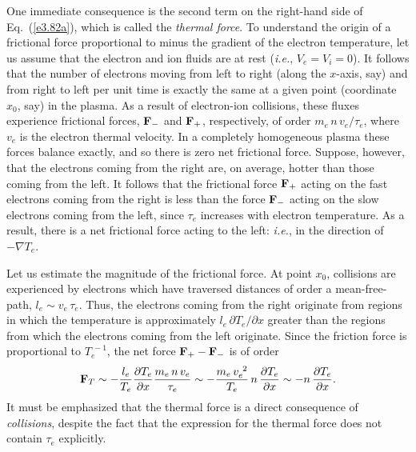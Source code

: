 One immediate consequence is the second term on the right-hand side of Eq.~(\ref{e3.82a}),
which is called the {\em thermal force}. To understand the origin of
a frictional force proportional to minus the gradient of the electron temperature,
let us assume that the electron and ion fluids are at rest ({\em i.e.}, 
$V_e=V_i =0$). It follows that the number of electrons moving from left to right
(along the $x$-axis, say) and from right to left per unit time is exactly the
same at a given point (coordinate $x_0$, say) in the plasma. As a result
of electron-ion collisions, these fluxes experience frictional forces,
${\bf F}_-$ and ${\bf F}_+$, respectively, of order $m_e\,n\,v_e/\tau_e$,
where $v_e$ is the electron thermal velocity. In a completely homogeneous
plasma these forces balance exactly, and so there is zero net frictional force.
Suppose, however, that the electrons coming from the right are, on average, hotter
than those coming from the left. It follows that the frictional force
${\bf F}_+$ acting on the fast electrons coming from the right is less than
the force ${\bf F}_-$ acting on the slow electrons coming from the left, since
$\tau_e$ increases with electron temperature. As a result, there is a net 
frictional force acting to the left: {\em i.e.}, in the direction of $-\nabla T_e$. 

Let us estimate the magnitude of the frictional force. At point $x_0$, collisions
are experienced by electrons which have traversed distances of order a
mean-free-path, $l_e\sim v_e\,\tau_e$. Thus, the electrons coming from the
right originate from regions in which the temperature is approximately
$l_e\,\partial T_e/\partial x$ greater than the regions from which the electrons
coming from the left originate. Since the friction force is proportional to 
$T_e^{~-1}$, the net force ${\bf F}_+ - {\bf F}_-$ is of order
\begin{equation}\label{e3.84}
{\bf F}_T \sim- \frac{l_e}{T_e} \frac{\partial T_e}{\partial x}
\frac{m_e\,n\,v_e}{\tau_e} \sim- \frac{m_e\,v_e^{~2}}{T_e}\, n\,\frac{\partial T_e}
{\partial x} \sim - n\,\frac{\partial T_e}
{\partial x}.
\end{equation}
It must be emphasized that the thermal force is a direct consequence of {\em 
collisions}, despite the fact that the expression for
the thermal force does not contain
$\tau_e$ explicitly. 

